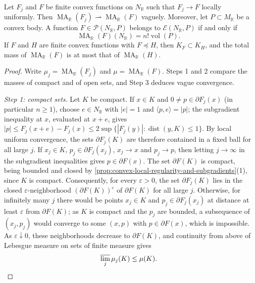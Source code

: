 \begin{theorem}\label{thm:real-monge-ampere-vague-continuity}
Let $F_j$ and $F$ be finite convex functions on $N_{\mathbb R}$ such that $F_j\to F$ locally uniformly. Then $\operatorname{MA}_{\mathbb R}(F_j)\rightharpoonup\operatorname{MA}_{\mathbb R}(F)$ vaguely. Moreover, let $P\subset M_{\mathbb R}$ be a convex body. A function $F\in\mathcal P(N_{\mathbb R},P)$ belongs to $\mathcal E(N_{\mathbb R},P)$ if and only if
\[
 \operatorname{MA}_{\mathbb R}(F)(N_{\mathbb R})=n!\operatorname{vol}(P).
\]
If $F$ and $H$ are finite convex functions with $F\preceq H$, then $K_F\subset K_H$, and the total mass of $\operatorname{MA}_{\mathbb R}(F)$ is at most that of $\operatorname{MA}_{\mathbb R}(H)$.
\end{theorem}
\begin{proof}
Write $\mu_j=\operatorname{MA}_{\mathbb R}(F_j)$ and $\mu=\operatorname{MA}_{\mathbb R}(F)$. Steps 1 and 2 compare the masses of compact and of open sets, and Step 3 deduces vague convergence.

\emph{Step 1: compact sets.} Let $K$ be compact. If $x\in K$ and $0\neq p\in\partial F_j(x)$ (in particular $n\geq1$), choose $e\in N_{\mathbb R}$ with $|e|=1$ and $\langle p,e\rangle=|p|$; the subgradient inequality at $x$, evaluated at $x+e$, gives $|p|\leq F_j(x+e)-F_j(x)\leq2\sup\{|F_j(y)|:\operatorname{dist}(y,K)\leq1\}$. By local uniform convergence, the sets $\partial F_j(K)$ are therefore contained in a fixed ball for all large $j$. If $x_j\in K$, $p_j\in\partial F_j(x_j)$, $x_j\to x$ and $p_j\to p$, then letting $j\to\infty$ in the subgradient inequalities gives $p\in\partial F(x)$. The set $\partial F(K)$ is compact, being bounded and closed by \cref{prop:convex-local-regularity-and-subgradients}(1), since $K$ is compact. Consequently, for every $\varepsilon>0$, the set $\partial F_j(K)$ lies in the closed $\varepsilon$-neighborhood $(\partial F(K))^\varepsilon$ of $\partial F(K)$ for all large $j$. Otherwise, for infinitely many $j$ there would be points $x_j\in K$ and $p_j\in\partial F_j(x_j)$ at distance at least $\varepsilon$ from $\partial F(K)$; as $K$ is compact and the $p_j$ are bounded, a subsequence of $(x_j,p_j)$ would converge to some $(x,p)$ with $p\in\partial F(x)$, which is impossible. As $\varepsilon\downarrow0$, these neighborhoods decrease to $\partial F(K)$, and continuity from above of Lebesgue measure on sets of finite measure gives
\[
 \varlimsup_j\mu_j(K)\leq\mu(K).
\]


\end{proof}
